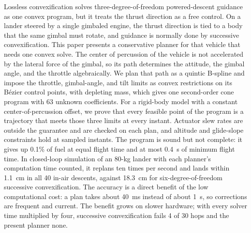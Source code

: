 \begin{aiaaabstract}
Lossless convexification solves three-degree-of-freedom powered-descent guidance as one convex program, but it treats the
thrust direction as a free control. On a lander steered by a single gimbaled engine, the thrust direction is tied to a body
that the same gimbal must rotate, and guidance is normally done by successive convexification. This paper presents a
conservative planner for that vehicle that needs one convex solve. The center of percussion of the vehicle is not accelerated
by the lateral force of the gimbal, so its path determines the attitude, the gimbal angle, and the throttle algebraically. We
plan that path as a quintic B-spline and impose the throttle, gimbal-angle, and tilt limits as convex restrictions on its
B\'ezier control points, with depleting mass, which gives one second-order cone program with 63 unknown coefficients. For a
rigid-body model with a constant center-of-percussion offset, we prove that every feasible point of the program is a
trajectory that meets those three limits at every instant. Actuator slew rates are outside the guarantee and are checked on
each plan, and altitude and glide-slope constraints hold at sampled instants. The program is sound but not complete: it gives
up 0.1\% of fuel at equal flight time and at most 0.4~s of minimum flight time. In closed-loop simulation of an 80-kg lander
with each planner's computation time counted, it replans ten times per second and lands within 1.1~cm in all 40 in-air
descents, against 18.3~cm for six-degree-of-freedom successive convexification. The accuracy is a direct benefit of the low computational cost: a plan takes about 40~ms instead of about 1~s, so corrections
are frequent and current. The benefit grows on slower hardware; with every solver time multiplied by four, successive
convexification fails 4 of 30 hops and the present planner none.
\end{aiaaabstract}


